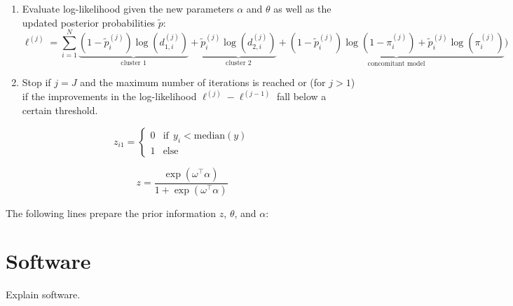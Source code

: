 \documentclass[article,nojss,shortnames]{jss}
\begin{document}
\begin{algorithm}
\begin{enumerate}
        \item Evaluate log-likelihood given the new parameters $\mathit{\alpha}$ and $\mathit{\theta}$
            as well as the updated posterior probabilities $\mathit{\tilde{p}}$:
            \begin{equation*}
                \ell^{(j)} = \sum_{i=1}^N 
                \underbrace{
                    (1 - \tilde{p}_i^{(j)}) \log(d_{1,i}^{(j)})
                }_{\text{cluster 1}}
                +
                \underbrace{
                    \tilde{p}_i^{(j)} \log(d_{2,i}^{(j)})
                }_{\text{cluster 2}}
                +
                \underbrace{
                    (1 - \tilde{p}_i^{(j)}) \log(1 - \pi_i^{(j)}) + \tilde{p}_i^{(j)} \log(\pi_i^{(j)})
                }_{\text{concomitant model}}
                \Big)
            \end{equation*}

        \item Stop if $j = J$ and the maximum number of iterations is reached or
            (for $j > 1$) if the improvements in the log-likelihood $\ell^{(j)} - \ell^{(j-1)}$
            fall below a certain threshold.
    \end{enumerate}
\end{algorithm}


\begin{equation}
    z_{i1} = \begin{cases} 0 & \text{if} ~~ y_i < \text{median}(y) \\ 1 & \text{else}\end{cases}
\end{equation}


\begin{equation}
    z = \frac{\exp(\omega^\top \alpha)}{1 + \exp(\omega^\top \alpha)}
\end{equation}

The following lines prepare the prior information $z$, $\theta$, and $\alpha$:



\section{Software}

Explain software.


\end{document}

